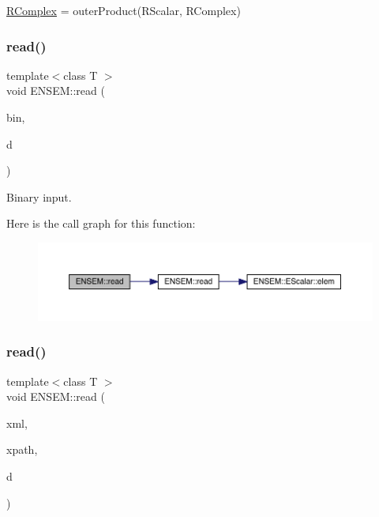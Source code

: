 \mbox{\hyperlink{classENSEM_1_1RComplex}{R\+Complex}} = outer\+Product(\+R\+Scalar, R\+Complex) 

\mbox{\label{group__rcomplex_ga26562c626033349312f9fb8fe7cdabcf}} 
\subsubsection{\texorpdfstring{read()}{read()}\hspace{0.1cm}{\footnotesize\ttfamily [1/2]}}
{\footnotesize\ttfamily template$<$class T $>$ \\
void E\+N\+S\+E\+M\+::read (\begin{DoxyParamCaption}\item[{\mbox{\hyperlink{classADATIO_1_1BinaryReader}{A\+D\+A\+T\+I\+O\+::\+Binary\+Reader}} \&}]{bin,  }\item[{\mbox{\hyperlink{classENSEM_1_1RComplex}{R\+Complex}}$<$ T $>$ \&}]{d }\end{DoxyParamCaption})\hspace{0.3cm}{\ttfamily [inline]}}



Binary input. 

Here is the call graph for this function\+:\nopagebreak
\begin{figure}[H]
\begin{center}
\leavevmode
\includegraphics[width=350pt]{da/dc7/group__rcomplex_ga26562c626033349312f9fb8fe7cdabcf_cgraph}
\end{center}
\end{figure}
\mbox{\label{group__rcomplex_ga4e957daaafbfd0e1b97883627dddd8f7}} 
\subsubsection{\texorpdfstring{read()}{read()}\hspace{0.1cm}{\footnotesize\ttfamily [2/2]}}
{\footnotesize\ttfamily template$<$class T $>$ \\
void E\+N\+S\+E\+M\+::read (\begin{DoxyParamCaption}\item[{\mbox{\hyperlink{classADATXML_1_1XMLReader}{A\+D\+A\+T\+X\+M\+L\+::\+X\+M\+L\+Reader}} \&}]{xml,  }\item[{const std\+::string \&}]{xpath,  }\item[{\mbox{\hyperlink{classENSEM_1_1RComplex}{R\+Complex}}$<$ T $>$ \&}]{d }\end{DoxyParamCaption})\hspace{0.3cm}{\ttfamily [inline]}}



